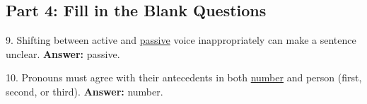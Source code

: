 \documentclass[12pt]{article}
\begin{document}
\subsection*{Part 4: Fill in the Blank Questions}

9. Shifting between active and \underline{passive} voice inappropriately can make a sentence unclear.  
\textbf{Answer:} passive.

10. Pronouns must agree with their antecedents in both \underline{number} and person (first, second, or third).  
\textbf{Answer:} number.
\end{document}

